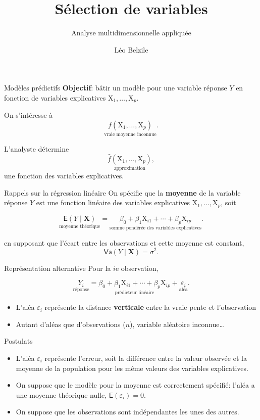 \documentclass[
  ignorenonframetext,
]{beamer}
\title{Sélection de variables}
\subtitle{Analyse multidimensionnelle appliquée}
\author{Léo Belzile}
\date{}
\institute{HEC Montréal}
\providecommand{\tightlist}{%
  \setlength{\itemsep}{0pt}\setlength{\parskip}{0pt}}\usepackage{longtable,booktabs,array}
\begin{document}
\frame{\titlepage}


\begin{frame}{Modèles prédictifs}
\label{moduxe8les-pruxe9dictifs}
\textbf{Objectif}: bâtir un modèle pour une variable réponse \(Y\) en
fonction de variables explicatives
\(\mathrm{X}_1, \ldots, \mathrm{X}_p\).

On s'intéresse à
\[\underset{\text{vraie moyenne inconnue}}{f(\mathrm{X}_1, \ldots, \mathrm{X}_p)}.\]

L'analyste détermine
\[\underset{\text{approximation}}{\widehat{f}(\mathrm{X}_1, \ldots, \mathrm{X}_p)},\]
une fonction des variables explicatives.
\end{frame}

\begin{frame}{Rappels sur la régression linéaire}
\label{rappels-sur-la-ruxe9gression-linuxe9aire}
On spécifie que la \textbf{moyenne} de la variable réponse \(Y\) est une
fonction linéaire des variables explicatives
\(\mathrm{X}_1, \ldots, \mathrm{X}_p\), soit

\[\underset{\text{moyenne théorique}}{\mathsf{E}(Y \mid \mathbf{X})} = \underset{\text{
somme pondérée des variables explicatives}}{\beta_0 + \beta_1 \mathrm{X}_{i1} + \cdots + \beta_p \mathrm{X}_{ip}}.\]

en supposant que l'écart entre les observations et cette moyenne est
constant, \[\mathsf{Va}(Y \mid \mathbf{X}) = \sigma^2.\]
\end{frame}

\begin{frame}{Représentation alternative}
\label{repruxe9sentation-alternative}
Pour la \(i\)e observation,

\[\underset{\text{réponse}}{Y_i} = \underset{\text{prédicteur linéaire}}{\beta_0 + \beta_1 \mathrm{X}_{i1} + \cdots + \beta_p \mathrm{X}_{ip}} + \underset{\text{aléa}}{\varepsilon_i}.\]

\begin{itemize}
\tightlist
\item
  L'aléa \(\varepsilon_i\) représente la distance \textbf{verticale}
  entre la vraie pente et l'observation
\item
  Autant d'aléas que d'observations (\(n\)), variable aléatoire
  inconnue\ldots{}
\end{itemize}
\end{frame}

\begin{frame}{Postulats}
\label{postulats}
\begin{itemize}
\tightlist
\item
  L'aléa \(\varepsilon_i\) représente l'erreur, soit la différence entre
  la valeur observée et la moyenne de la population pour les même
  valeurs des variables explicatives.
\item
  On suppose que le modèle pour la moyenne est correctement spécifié:
  l'aléa a une moyenne théorique nulle, \(\mathsf{E}(\varepsilon_i)=0\).
\item
  On suppose que les observations sont indépendantes les unes des
  autres.
\end{itemize}
\end{frame}
\end{document}
